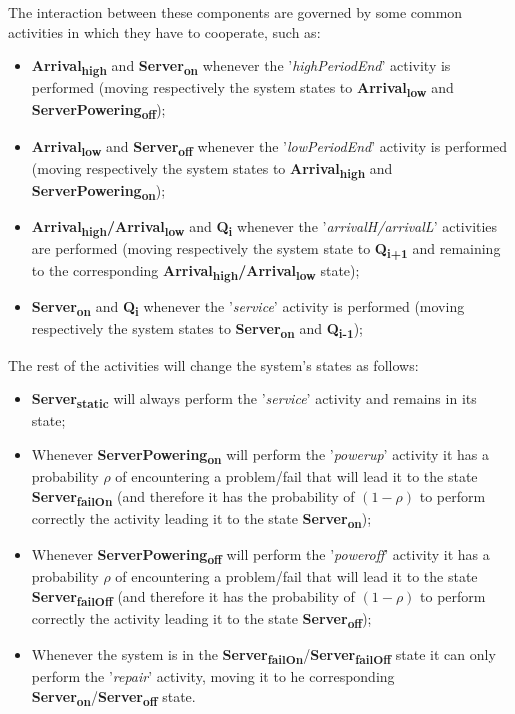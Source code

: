 \documentclass{article}
\begin{document}
\noindent The interaction between these components are governed by some common activities in which they have to cooperate, such as:

\begin{itemize}
    \item \textbf{Arrival\textsubscript{high}} and \textbf{Server\textsubscript{on}} whenever the '\textit{highPeriodEnd}' activity is performed (moving respectively the system states to \textbf{Arrival\textsubscript{low}} and \textbf{ServerPowering\textsubscript{off}});
    \item \textbf{Arrival\textsubscript{low}} and \textbf{Server\textsubscript{off}} whenever the '\textit{lowPeriodEnd}' activity is performed (moving respectively the system states to \textbf{Arrival\textsubscript{high}} and \textbf{ServerPowering\textsubscript{on}});
    \item \textbf{Arrival\textsubscript{high}/Arrival\textsubscript{low}} and \textbf{Q\textsubscript{i}} whenever the '\textit{arrivalH/arrivalL}' activities are performed (moving respectively the system state to \textbf{Q\textsubscript{i+1}} and remaining to the corresponding \textbf{Arrival\textsubscript{high}/Arrival\textsubscript{low}} state);
    \item \textbf{Server\textsubscript{on}} and \textbf{Q\textsubscript{i}} whenever the '\textit{service}' activity is performed (moving respectively the system states to \textbf{Server\textsubscript{on}} and \textbf{Q\textsubscript{i-1}});
\end{itemize}

\noindent The rest of the activities will change the system's states as follows:

\begin{itemize}
    \item \textbf{Server\textsubscript{static}} will always perform the '\textit{service}' activity and remains in its state;
    \item Whenever \textbf{ServerPowering\textsubscript{on}} will perform the '\textit{powerup}' activity it has a probability \(\rho\) of encountering a problem/fail that will lead it to the state \textbf{Server\textsubscript{failOn}} (and therefore it has the probability of \((1-\rho)\) to perform correctly the activity leading it to the state \textbf{Server\textsubscript{on}});
    \item Whenever \textbf{ServerPowering\textsubscript{off}} will perform the '\textit{poweroff}' activity it has a probability \(\rho\) of encountering a problem/fail that will lead it to the state \textbf{Server\textsubscript{failOff}} (and therefore it has the probability of \((1-\rho)\) to perform correctly the activity leading it to the state \textbf{Server\textsubscript{off}});
    \item Whenever the system is in the \textbf{Server\textsubscript{failOn}}/\textbf{Server\textsubscript{failOff}} state it can only perform the '\textit{repair}' activity, moving it to he corresponding \textbf{Server\textsubscript{on}}/\textbf{Server\textsubscript{off}} state.
\end{itemize}
\end{document}
